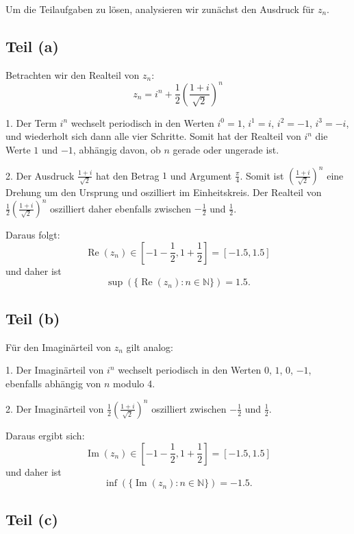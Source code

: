 \documentclass[11pt]{article}
\begin{document}
Um die Teilaufgaben zu lösen, analysieren wir zunächst den Ausdruck für \( z_n \).

\subsection*{Teil (a)}

Betrachten wir den Realteil von \( z_n \):
\[
z_n = i^n + \frac{1}{2} \left( \frac{1 + i}{\sqrt{2}} \right)^n
\]

1. Der Term \( i^n \) wechselt periodisch in den Werten \( i^0 = 1 \), \( i^1 = i \), \( i^2 = -1 \), \( i^3 = -i \), und wiederholt sich dann alle vier Schritte. Somit hat der Realteil von \( i^n \) die Werte \( 1 \) und \( -1 \), abhängig davon, ob \( n \) gerade oder ungerade ist.

2. Der Ausdruck \( \frac{1 + i}{\sqrt{2}} \) hat den Betrag \( 1 \) und Argument \( \frac{\pi}{4} \). Somit ist \( \left( \frac{1 + i}{\sqrt{2}} \right)^n \) eine Drehung um den Ursprung und oszilliert im Einheitskreis. Der Realteil von \( \frac{1}{2} \left( \frac{1 + i}{\sqrt{2}} \right)^n \) oszilliert daher ebenfalls zwischen \( -\frac{1}{2} \) und \( \frac{1}{2} \).

Daraus folgt:
\[
\operatorname{Re}(z_n) \in \left[ -1 - \frac{1}{2}, 1 + \frac{1}{2} \right] = [-1.5, 1.5]
\]
und daher ist
\[
\sup(\{\operatorname{Re}(z_n) : n \in \mathbb{N}\}) = 1.5.
\]

\subsection*{Teil (b)}

Für den Imaginärteil von \( z_n \) gilt analog:

1. Der Imaginärteil von \( i^n \) wechselt periodisch in den Werten \( 0 \), \( 1 \), \( 0 \), \( -1 \), ebenfalls abhängig von \( n \) modulo 4.

2. Der Imaginärteil von \( \frac{1}{2} \left( \frac{1 + i}{\sqrt{2}} \right)^n \) oszilliert zwischen \( -\frac{1}{2} \) und \( \frac{1}{2} \).

Daraus ergibt sich:
\[
\operatorname{Im}(z_n) \in \left[ -1 - \frac{1}{2}, 1 + \frac{1}{2} \right] = [-1.5, 1.5]
\]
und daher ist
\[
\inf(\{\operatorname{Im}(z_n) : n \in \mathbb{N}\}) = -1.5.
\]

\subsection*{Teil (c)}
\end{document}
